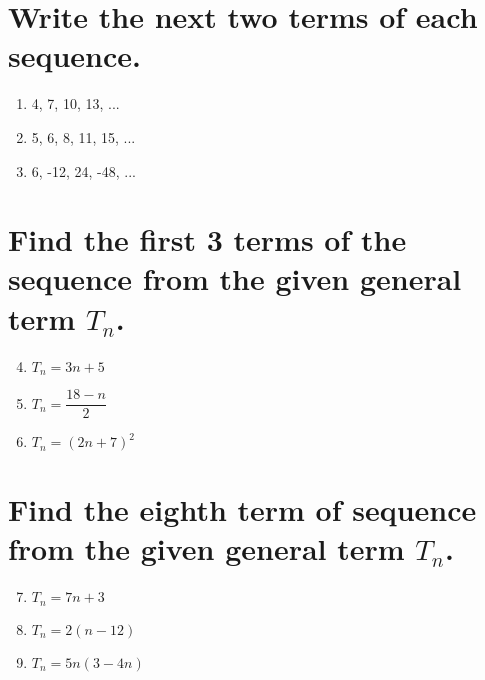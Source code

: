 \documentclass[12pt,letterpaper]{article}
\begin{document}
\section*{Write the next two terms of each sequence.}

\begin{large}
\begin{enumerate}

\item 4, 7, 10, 13, ...

\addvspace{0.3in}

\item 5, 6, 8, 11, 15, ...

\addvspace{0.3in}

\item 6, -12, 24, -48, ...

\addvspace{0.3in}

\end{enumerate}
\end{large}

\section*{Find the first 3 terms of the sequence from the given general term $T_{n}$.}

\begin{large}
\begin{enumerate}
\setcounter{enumi}{3}

\item $T_{n} = 3n + 5$

\addvspace{0.3in}

\item $T_{n} = \dfrac{18 - n}{2}$

\addvspace{0.3in}

\item $T_{n} = (2n + 7)^2$ 

\addvspace{0.3in}

\end{enumerate}
\end{large}

\section*{Find the eighth term of sequence from the given general term $T_{n}$.}

\begin{large}
\begin{enumerate}
\setcounter{enumi}{6}

\item $T_{n} = 7n + 3$

\addvspace{0.3in}

\item $T_{n} = 2(n - 12)$

\addvspace{0.3in}

\item $T_{n} = 5n(3 - 4n)$

\addvspace{0.3in}

\end{enumerate}
\end{large}
\end{document}
